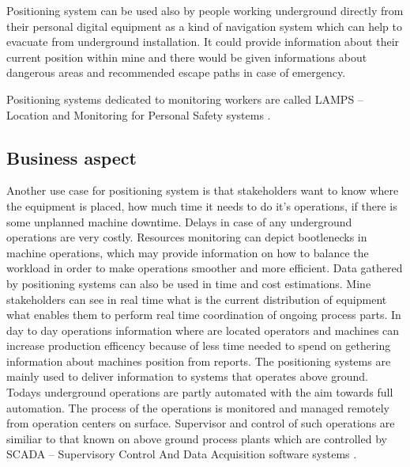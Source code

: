 \documentclass[../main.tex]{subfiles}
\begin{document}
Positioning system can be used also by people working underground directly from their personal digital equipment\cite{Thesis_CM} as a kind of navigation system which can help to evacuate from underground installation. It could provide information about their current position within mine and there would be given informations about dangerous areas and recommended escape paths in case of emergency.

Positioning systems dedicated to monitoring workers are called LAMPS -- Location and Monitoring for Personal Safety systems \cite{Book_wireless_in_mines}.

\subsection{Business aspect} %
\label{sub:business_aspect}

Another use case for positioning system is that stakeholders want to know where the equipment is placed, how much time it needs to do it's operations, if there is some unplanned machine downtime. Delays in case of any underground operations are very costly. Resources monitoring can depict bootlenecks in machine operations, which may provide information on how to balance the workload in order to make operations smoother and more efficient. Data gathered by positioning systems can also be used in time and cost estimations. Mine stakeholders can see in real time what is the current distribution of equipment what enables them to perform real time coordination of ongoing process parts. In day to day operations information where are located operators and machines can increase production efficency because of less time needed to spend on gethering information about machines position from reports\cite{thesis_tablet_positioning}. The positioning systems are mainly used to deliver information to systems that operates above ground. Todays underground operations are partly automated with the aim towards full automation. The process of the operations is monitored and managed remotely from operation centers on surface. Supervisor and control of such operations are similiar to that known on above ground process plants which are controlled by SCADA -- Supervisory Control And Data Acquisition software systems \cite{Thesis_CM}.
\end{document}
